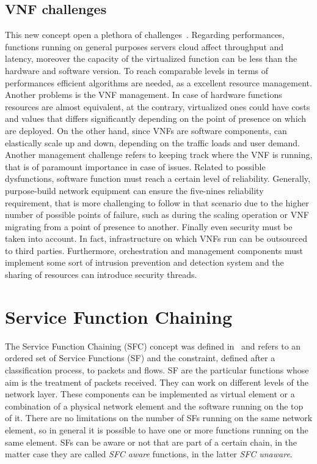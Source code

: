 \subsection{VNF challenges}
This new concept open a plethora of challenges~\cite{han2015network}. Regarding
performances, functions running on general purposes servers cloud affect
throughput and latency, moreover the capacity of the virtualized function can
be less than the hardware and software version. To reach comparable levels in
terms of performances efficient algorithms are needed, as a excellent resource
management. Another problems is the VNF management. In case of hardware
functions resources are almost equivalent, at the contrary, virtualized ones
could have costs and values that differs significantly depending on the point
of presence on which are deployed. On the other hand, since VNFs are software
components, can elastically scale up and down, depending on the traffic loads
and user demand. Another management challenge refers to keeping track where the
VNF is running, that is of paramount importance in case of issues. Related to
possible dysfunctions, software function must reach a certain level of
reliability. Generally, purpose-build network equipment can ensure the
five-nines reliability requirement, that is more challenging to follow in that
scenario due to the higher number of possible points of failure, such as during
the scaling operation or VNF migrating from a point of presence to another.
Finally even security must be taken into account. In fact, infrastructure on
which VNFs run can be outsourced to third parties. Furthermore, orchestration
and management components must implement some sort of intrusion prevention and
detection system and the sharing of resources can introduce security threads.

\section{Service Function Chaining}
The Service Function Chaining (SFC) concept was defined  in~\cite{halpern2015service} and refers to an ordered set of Service Functions (SF) and the constraint, defined after a classification process, to packets and flows. SF are the particular functions whose aim is the treatment of packets received. They can work on different levels of the network layer. These components can be implemented as virtual element or a combination of a physical network element and the software running on the top of it. There are no limitations on the number of SFs running on the same network element, so in general it is possible to have one or more functions running on the same element. SFs can be aware or not that are part of a certain chain, in the matter case they are called \emph{SFC aware} functions, in the latter \emph{SFC unaware}.

